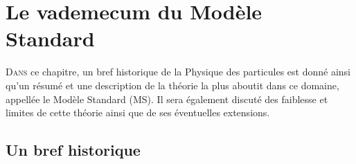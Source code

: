 \chapter{ Le vademecum du Modèle Standard }
\renewcommand\chapterillustration{SM/sm2}
\ThisULCornerWallPaper{1}{\chapterillustration}
\minitoc

\lettrine[lines=4, slope=-0.5em]{D}{ans} ce chapitre, un bref historique de la Physique des particules est donné ainsi qu'un résumé et une description de la théorie la plus aboutit dans ce domaine, appellée le Modèle Standard (MS). Il sera également discuté des faiblesse et limites de cette théorie ainsi que de ses éventuelles extensions.

\section{Un bref historique}

